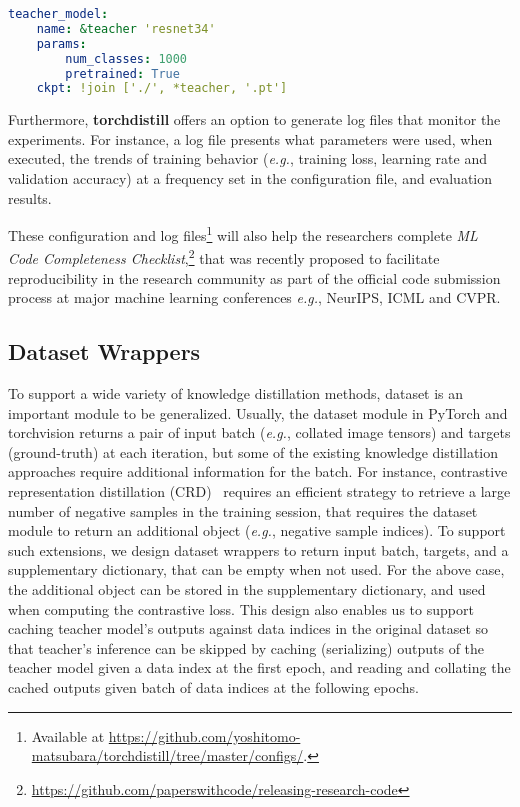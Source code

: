 \documentclass[runningheads]{llncs}
\newcommand{\FRAMEWORK}{{\bf torchdistill}\xspace}
\begin{document}
\begin{lstlisting}[language=yaml, backgroundcolor=\color{MintCream}]
teacher_model:
    name: &teacher 'resnet34'
    params:
        num_classes: 1000
        pretrained: True
    ckpt: !join ['./', *teacher, '.pt']
\end{lstlisting}

Furthermore, \FRAMEWORK offers an option to generate log files that monitor the experiments.
For instance, a log file presents what parameters were used, when executed, the trends of training behavior (\emph{e.g.}, training loss, learning rate and validation accuracy) at a frequency set in the configuration file, and evaluation results.

These configuration and log files\footnote{\label{fn:configs}Available at \url{https://github.com/yoshitomo-matsubara/torchdistill/tree/master/configs/}.} will also help the researchers complete \emph{ML Code Completeness Checklist},\footnote{\label{fn:ml_code_checklist}\url{https://github.com/paperswithcode/releasing-research-code}} that was recently proposed to facilitate reproducibility in the research community as part of the official code submission process at major machine learning conferences \emph{e.g.}, NeurIPS, ICML and CVPR.


\subsection{Dataset Wrappers}
\label{subsec:dataset_wrappers}

To support a wide variety of knowledge distillation methods, dataset is an important module to be generalized.
Usually, the dataset module in PyTorch and torchvision returns a pair of input batch (\emph{e.g.}, collated image tensors) and targets (ground-truth) at each iteration, but some of the existing knowledge distillation approaches require additional information for the batch.
For instance, contrastive representation distillation (CRD)~\cite{tian2020contrastive} requires an efficient strategy to retrieve a large number of negative samples in the training session, that requires the dataset module to return an additional object (\emph{e.g.}, negative sample indices).
To support such extensions, we design dataset wrappers to return input batch, targets, and a supplementary dictionary, that can be empty when not used.
For the above case, the additional object can be stored in the supplementary dictionary, and used when computing the contrastive loss.
This design also enables us to support caching teacher model's outputs against data indices in the original dataset so that teacher's inference can be skipped by caching (serializing) outputs of the teacher model given a data index at the first epoch, and reading and collating the cached outputs given batch of data indices at the following epochs.
\end{document}
